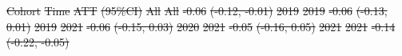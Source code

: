 \documentclass[
  letterpaper,
  DIV=11,
  numbers=noendperiod]{scrartcl}
\makeatletter
\renewenvironment{figure}%
   {\renewcommand\familydefault\sfdefault
    \@float{figure}}
   {\end@float}
\providecommand{\DIFdeltex}[1]{{\protect\color{red}\sout{#1}}}                      %
\providecommand{\DIFdelFL}[1]{\DIFdel{#1}} %
\providecommand{\DIFdel}[1]{\texorpdfstring{\DIFdeltex{#1}}{}} %
\makeatother
\begin{document}
\DIFdelFL{Cohort }%
\DIFdelFL{Time }%
\DIFdelFL{ATT }%
\DIFdelFL{(95\%CI)}%
\DIFdelFL{All }%
\DIFdelFL{All }%
\DIFdelFL{-0.06 }%
\DIFdelFL{(-0.12, -0.01)}%
\DIFdelFL{2019 }%
\DIFdelFL{2019 }%
\DIFdelFL{-0.06 }%
\DIFdelFL{(-0.13, 0.01)}%
\DIFdelFL{2019 }%
\DIFdelFL{2021 }%
\DIFdelFL{-0.06 }%
\DIFdelFL{(-0.15, 0.03)}%
\DIFdelFL{2020 }%
\DIFdelFL{2021 }%
\DIFdelFL{-0.05 }%
\DIFdelFL{(-0.16, 0.05)}%
\DIFdelFL{2021 }%
\DIFdelFL{2021 }%
\DIFdelFL{-0.14 }%
\DIFdelFL{(-0.22, -0.05)}%



\end{document}
